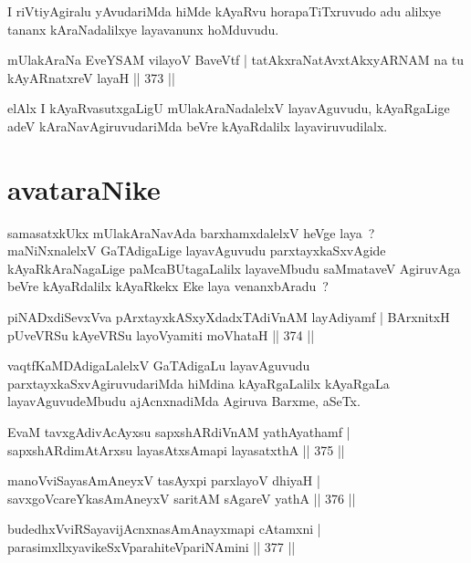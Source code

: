 \begin{artha}
I riVtiyAgiralu yAvudariMda hiMde kAyaRvu horapaTiTxruvudo adu alilxye tananx kAraNadalilxye layavanunx hoMduvudu.
\end{artha}

\begin{shl}
mUlakAraNa EveYSAM vilayoV BaveVtf |
tatAkxraNatAvxtAkxyARNAM na tu kAyARnatxreV layaH \hfill || 373 ||
\end{shl}

\begin{artha}
elAlx I kAyaRvasutxgaLigU mUlakAraNadalelxV layavAguvudu, kAyaRgaLige adeV kAraNavAgiruvudariMda beVre kAyaRdalilx layaviruvudilalx.
\end{artha}

\section*{avataraNike}

\begin{artha}
samasatxkUkx mUlakAraNavAda barxhamxdalelxV heVge laya~? maNiNxnalelxV GaTAdigaLige layavAguvudu parxtayxkaSxvAgide kAyaRkAraNagaLige paMcaBUtagaLalilx layaveMbudu saMmataveV AgiruvAga beVre kAyaRdalilx kAyaRkekx Eke laya venanxbAradu~?
\end{artha}

\begin{shl}
piNADxdiSevxVva pArxtayxkASxyXdadxTAdiVnAM layAdiyamf |
BArxnitxH pUveVRSu kAyeVRSu layoV\s yamiti moVhataH \hfill || 374 ||
\end{shl}

\begin{artha}
vaqtfKaMDAdigaLalelxV GaTAdigaLu layavAguvudu parxtayxkaSxvAgiruvudariMda hiMdina kAyaRgaLalilx kAyaRgaLa layavAguvudeMbudu ajAcnxnadiMda Agiruva Barxme, aSeTx.
\end{artha}

\begin{shl}
EvaM tavxgAdivAcAyxsu sapxshARdiVnAM yathAyathamf |
sapxshARdimAtArxsu layasAtxsAmapi layasatxthA \hfill || 375 ||
\end{shl}
\begin{shl}
manoVviSayasAmAneyxV tasAyxpi parxlayoV dhiyaH |
savxgoVcareYkasAmAneyxV saritAM sAgareV yathA \hfill || 376 ||
\end{shl}
\begin{shl}
budedhxVviRSayavijAcnxnasAmAnayxmapi cA\s \s tamxni |
parasimxllxyavikeSxVparahiteV\s pariNAmini \hfill || 377 ||
\end{shl}

